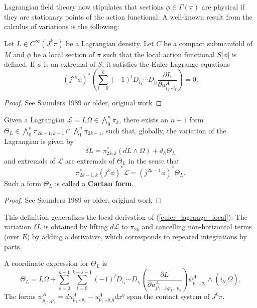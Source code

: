 Lagrangian field theory now stipulates that sections $\phi\in\Gamma(\pi)$ are physical if they are stationary points of the action functional. A well-known result from the calculus of variations is the following:
\begin{proposition}
  Let $L\in C^\infty(J^k\pi)$ be a Lagrangian density. Let $C$ be a compact submanifold of $M$ and $\phi$ be a local section of $\pi$ such that the local action functional $S\lbrack\phi\rbrack$ is defined. If $\phi$ is an extremal of $S$, it satisfies the Euler-Lagrange equations
  \begin{equation}\label{euler_lagrange_local}
    (j^{2k}\phi)^\ast\left( \sum_{l=0}^{k} (-1)^l D_{i_1} \cdots D_{i_l} \frac{\partial L}{\partial u^A_{i_1\cdots i_l}}\right) = 0.
  \end{equation}
\end{proposition}
\begin{proof}
  See Saunders 1989 or older, original work
\end{proof}

\begin{proposition}
  Given a Lagrangian $\mathcal L = L\Omega \in \bigwedge^n_0\pi_k$, there exists an $n+1$ form $\Theta_L\in\bigwedge^{n}_0\pi_{2k-1,k-1}\cap\bigwedge^{n}_{1}\pi_{2k-1}$, such that, globally, the variation of the Lagrangian is given by
  \begin{equation}\label{global_lagrange_form}
    \delta L = \pi^\ast_{2k,k} \left( dL\wedge\Omega\right) + d_h \Theta_L
  \end{equation}
  and extremals of $\mathcal L$ are extremals of $\Theta_L$ in the sense that
  \begin{equation}
    \pi_{2k-1,k}^\ast (j^k\phi)^\ast\mathcal L = (j^{2k-1}\phi)^\ast\Theta_L.
  \end{equation}
  Such a form $\Theta_L$ is called a \textbf{Cartan form}.
\end{proposition}
\begin{proof}
  See Saunders 1989 or older, original work
\end{proof}

This definition generalizes the local derivation of (\ref{euler_lagrange_local}): The variation $\delta L$ is obtained by lifting $d\mathcal L$ to $\pi_{2k}$ and cancelling non-horizontal terms (over $E$) by adding a derivative, which corresponds to repeated integrations by parts.

A coordinate expression for $\Theta_L$ is
\begin{equation}\label{local_cartan_form}
  \Theta_L = L\Omega + \sum_{s=0}^{k-1} \sum_{l=0}^{k-s-1} (-1)^l D_{i_1} \cdots D_{i_l} \left(\frac{\partial L}{\partial u^A_{j i_1 \dots i_{l} p_1 \dots p_s}}\right) \psi^A_{p_1\dots p_s} \wedge \left(i_{\partial_j}\Omega\right).
\end{equation}
The forms $\psi^A_{p_1\dots p_s} = du^A_{p_1\dots p_s} - u^A_{p_1\dots p_sq} dx^q$ span the contact system of $J^k\pi$.


